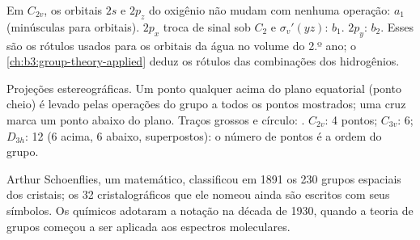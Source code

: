 \begin{example}\label{ex:b3:point-groups:water-orbitals}
Em $C_{2v}$, os orbitais $2s$ e $2p_z$ do oxigênio não mudam com nenhuma
operação: $a_1$ (minúsculas para orbitais). $2p_x$ troca de sinal sob $C_2$ e
$\sigma_v'(yz)$: $b_1$. $2p_y$: $b_2$. Esses são os rótulos usados para os orbitais
da água no volume do 2.º ano; o \cref{ch:b3:group-theory-applied} deduz os
rótulos das combinações dos hidrogênios.
\end{example}

\begin{omfigure}

{\small Projeções estereográficas. Um ponto qualquer acima do plano equatorial
(ponto cheio) é levado pelas operações do grupo a todos os pontos
mostrados; uma cruz marca um ponto abaixo do plano. Traços grossos e círculo:
. $C_{2v}$: 4 pontos; $C_{3v}$: 6; $D_{3h}$: 12 (6 acima, 6
abaixo, superpostos): o número de pontos é a ordem do grupo.}
\end{omfigure}

\begin{history}
Arthur Schoenflies, um matemático, classificou em 1891 os 230 grupos
espaciais dos cristais; os 32  cristalográficos que ele nomeou
ainda são escritos com seus símbolos. Os químicos adotaram a notação na
década de 1930, quando a teoria de grupos começou a ser aplicada aos espectros
moleculares.
\end{history}

